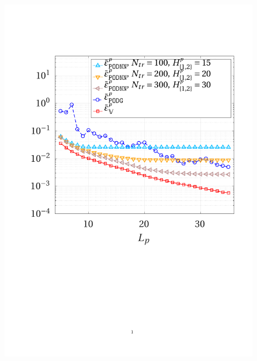 \documentclass{elsarticle}
\numberwithin{equation}{section}
\theoremstyle{theorem}
\theoremstyle{definition}
\theoremstyle{remark}
\theoremstyle{proposition}
\numberwithin{figure}{section}
\begin{document}
\begin{figure}[t!]
			\includegraphics[scale = 0.4, trim = {2cm 9cm 1.5cm 3.5cm}, clip]{dc_200_p_error_vs_rank} \\

\end{figure}
\end{document}
